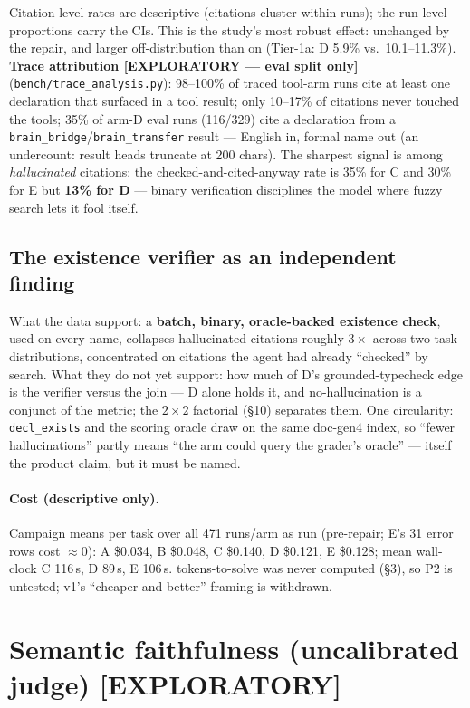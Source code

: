 \documentclass[10pt]{article}
\newcommand{\code}[1]{\texttt{#1}}
\begin{document}
Citation-level rates are descriptive (citations cluster within runs); the
run-level proportions carry the CIs. This is the study's most robust
effect: unchanged by the repair, and larger off-distribution than on
(Tier-1a: D 5.9\% vs.\ 10.1--11.3\%). \textbf{Trace attribution
[EXPLORATORY --- eval split only]} (\code{bench/trace\_analysis.py}):
98--100\% of traced tool-arm runs cite at least one declaration that
surfaced in a tool result; only 10--17\% of citations never touched the
tools; 35\% of arm-D eval runs (116/329) cite a declaration from a
\code{brain\_bridge}/\code{brain\_transfer} result --- English in, formal
name out (an undercount: result heads truncate at 200 chars). The sharpest
signal is among \emph{hallucinated} citations: the checked-and-cited-anyway
rate is 35\% for C and 30\% for E but \textbf{13\% for D} --- binary
verification disciplines the model where fuzzy search lets it fool itself.

\subsection{The existence verifier as an independent finding}\label{sec:verifier}

What the data support: a \textbf{batch, binary, oracle-backed existence
check}, used on every name, collapses hallucinated citations roughly
$3\times$ across two task distributions, concentrated on citations the
agent had already ``checked'' by search. What they do not yet support: how
much of D's grounded-typecheck edge is the verifier versus the join --- D
alone holds it, and no-hallucination is a conjunct of the metric; the
$2\times2$ factorial (\S10) separates them. One circularity:
\code{decl\_exists} and the scoring oracle draw on the same doc-gen4
index, so ``fewer hallucinations'' partly means ``the arm could query the
grader's oracle'' --- itself the product claim, but it must be named.

\paragraph{Cost (descriptive only).} Campaign means per task over all 471
runs/arm as run (pre-repair; E's 31 error rows cost ${\approx}$0):
A \$0.034, B \$0.048, C \$0.140, D \$0.121, E \$0.128; mean wall-clock
C 116\,s, D 89\,s, E 106\,s. tokens-to-solve was never computed (\S3), so
P2 is untested; v1's ``cheaper and better'' framing is withdrawn.

\section{Semantic faithfulness (uncalibrated judge) [EXPLORATORY]}\label{sec:judge}
\end{document}

